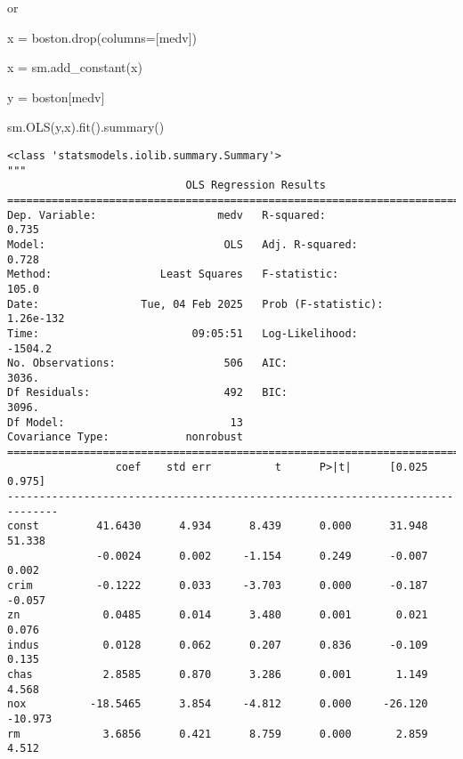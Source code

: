 \documentclass[
  letterpaper,
  DIV=11,
  numbers=noendperiod]{scrreprt}
\newenvironment{Shaded}{\begin{snugshade}}{\end{snugshade}}
\newcommand{\NormalTok}[1]{\textcolor[rgb]{0.00,0.23,0.31}{#1}}
\newcommand{\OperatorTok}[1]{\textcolor[rgb]{0.37,0.37,0.37}{#1}}
\newcommand{\StringTok}[1]{\textcolor[rgb]{0.13,0.47,0.30}{#1}}
\begin{document}
or

\begin{Shaded}
\begin{Highlighting}[]
\NormalTok{x }\OperatorTok{=}\NormalTok{ boston.drop(columns}\OperatorTok{=}\NormalTok{[}\StringTok{\textquotesingle{}medv\textquotesingle{}}\NormalTok{])}

\NormalTok{x }\OperatorTok{=}\NormalTok{ sm.add\_constant(x)}

\NormalTok{y }\OperatorTok{=}\NormalTok{ boston[}\StringTok{\textquotesingle{}medv\textquotesingle{}}\NormalTok{]}


\NormalTok{sm.OLS(y,x).fit().summary()}
\end{Highlighting}
\end{Shaded}

\begin{verbatim}
<class 'statsmodels.iolib.summary.Summary'>
"""
                            OLS Regression Results                            
==============================================================================
Dep. Variable:                   medv   R-squared:                       0.735
Model:                            OLS   Adj. R-squared:                  0.728
Method:                 Least Squares   F-statistic:                     105.0
Date:                Tue, 04 Feb 2025   Prob (F-statistic):          1.26e-132
Time:                        09:05:51   Log-Likelihood:                -1504.2
No. Observations:                 506   AIC:                             3036.
Df Residuals:                     492   BIC:                             3096.
Df Model:                          13                                         
Covariance Type:            nonrobust                                         
==============================================================================
                 coef    std err          t      P>|t|      [0.025      0.975]
------------------------------------------------------------------------------
const         41.6430      4.934      8.439      0.000      31.948      51.338
              -0.0024      0.002     -1.154      0.249      -0.007       0.002
crim          -0.1222      0.033     -3.703      0.000      -0.187      -0.057
zn             0.0485      0.014      3.480      0.001       0.021       0.076
indus          0.0128      0.062      0.207      0.836      -0.109       0.135
chas           2.8585      0.870      3.286      0.001       1.149       4.568
nox          -18.5465      3.854     -4.812      0.000     -26.120     -10.973
rm             3.6856      0.421      8.759      0.000       2.859       4.512

\end{verbatim}
\end{document}
